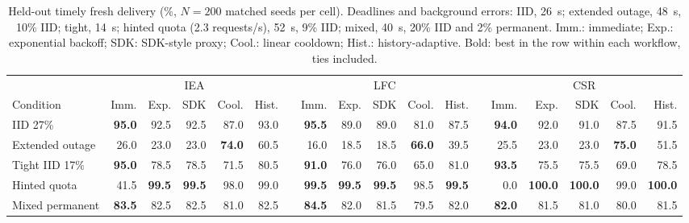 \begin{table}[t]
\centering
\caption{Held-out timely fresh delivery (\%, $N=200$ matched seeds per cell). Deadlines and background errors: IID, 26~s; extended outage, 48~s, 10\% IID; tight, 14~s; hinted quota (2.3 requests/s), 52~s, 9\% IID; mixed, 40~s, 20\% IID and 2\% permanent. Imm.: immediate; Exp.: exponential backoff; SDK: SDK-style proxy; Cool.: linear cooldown; Hist.: history-adaptive. Bold: best in the row within each workflow, ties included.}
\label{tab:main}
\footnotesize
\setlength{\tabcolsep}{3.4pt}
\begin{tabular}{@{}l*{5}{r}c*{5}{r}c*{5}{r}@{}}\toprule
 & \multicolumn{5}{c}{IEA} && \multicolumn{5}{c}{LFC} && \multicolumn{5}{c}{CSR}\\
\cmidrule(lr){2-6}\cmidrule(lr){8-12}\cmidrule(lr){14-18}
Condition & Imm. & Exp. & SDK & Cool. & Hist. && Imm. & Exp. & SDK & Cool. & Hist. && Imm. & Exp. & SDK & Cool. & Hist.\\\midrule
IID 27\% & \textbf{95.0} & 92.5 & 92.5 & 87.0 & 93.0 && \textbf{95.5} & 89.0 & 89.0 & 81.0 & 87.5 && \textbf{94.0} & 92.0 & 91.0 & 87.5 & 91.5\\
Extended outage & 26.0 & 23.0 & 23.0 & \textbf{74.0} & 60.5 && 16.0 & 18.5 & 18.5 & \textbf{66.0} & 39.5 && 25.5 & 23.0 & 23.0 & \textbf{75.0} & 51.5\\
Tight IID 17\% & \textbf{95.0} & 78.5 & 78.5 & 71.5 & 80.5 && \textbf{91.0} & 76.0 & 76.0 & 65.0 & 81.0 && \textbf{93.5} & 75.5 & 75.5 & 69.0 & 78.5\\
Hinted quota & 41.5 & \textbf{99.5} & \textbf{99.5} & 98.0 & 99.0 && \textbf{99.5} & \textbf{99.5} & \textbf{99.5} & 98.5 & \textbf{99.5} && 0.0 & \textbf{100.0} & \textbf{100.0} & 99.0 & \textbf{100.0}\\
Mixed permanent & \textbf{83.5} & 82.5 & 82.5 & 81.0 & 82.5 && \textbf{84.5} & 82.0 & 81.5 & 79.5 & 82.0 && \textbf{82.0} & 81.5 & 81.0 & 80.0 & 81.5\\\bottomrule
\end{tabular}
\end{table}
